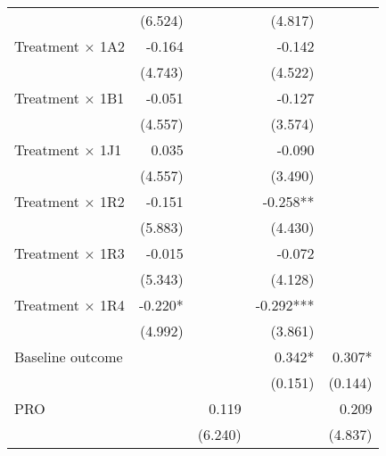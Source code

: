 \begin{table}[htbp]
\begin{tabular}{l*{4}{D{.}{.}{-1}}}
                    &             (6.524)   &                       &             (4.817)   &                       \\
Treatment $\times$ 1A2&           -0.164      &                     &           -0.142    &                         \\
                    &             (4.743)   &                       &             (4.522)   &                       \\
Treatment $\times$ 1B1&           -0.051      &                     &         -0.127      &                         \\
                    &             (4.557)   &                       &             (3.574)   &                       \\
Treatment $\times$ 1J1&           0.035       &                     &            -0.090   &                         \\
                    &             (4.557)   &                       &             (3.490)   &                       \\
Treatment $\times$ 1R2&                -0.151 &                     &            -0.258** &                         \\
                   &             (5.883)   &                        &             (4.430)   &                       \\
Treatment $\times$ 1R3&            -0.015     &                     &            -0.072   &                         \\
                    &             (5.343)   &                       &             (4.128)   &                       \\
Treatment $\times$ 1R4&              -0.220*  &                     &            -0.292***&                         \\
                   &             (4.992)   &                        &             (3.861)   &                       \\
Baseline outcome    &                       &                       &               0.342*  &               0.307*  \\
                    &                       &                       &             (0.151)   &             (0.144)   \\
PRO                 &                       &               0.119   &                       &               0.209   \\
                    &                       &             (6.240)   &                       &             (4.837)   \\

\end{tabular}
\end{table}
